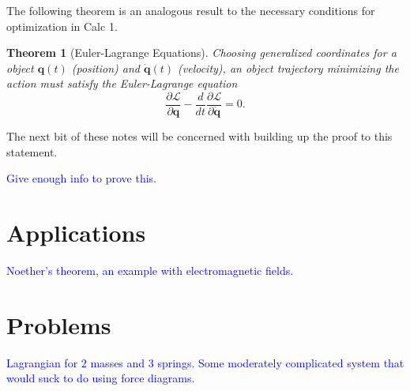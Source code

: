 \documentclass[12pt]{article}
\newtheorem{theorem}{Theorem}[part]
\theoremstyle{definition}
\begin{document}
The following theorem is an analogous result to the necessary conditions for optimization in Calc 1.

\begin{theorem}[Euler-Lagrange Equations]
Choosing generalized coordinates for a object $\mathbf{q}(t)$ (position) and $\mathbf{\Dot{q}}(t)$ (velocity), an object trajectory minimizing the action must satisfy the Euler-Lagrange equation
\[
\frac{\partial\mathcal{L}}{\partial \mathbf{q}}-\frac{d}{dt}\frac{\partial \mathcal{L}}{\partial \Dot{\mathbf{q}}}=0.
\]
\end{theorem}

The next bit of these notes will be concerned with building up the proof to this statement.

\textcolor{blue}{Give enough info to prove this.}


\section{Applications}
\textcolor{blue}{Noether's theorem, an example with electromagnetic fields.}

\section{Problems}
\textcolor{blue}{Lagrangian for $2$ masses and $3$ springs. Some moderately complicated system that would suck to do using force diagrams.}
\end{document}
